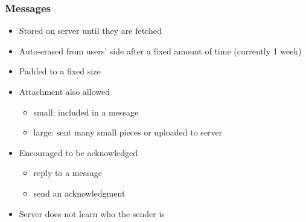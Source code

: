 \begin{frame}
	\frametitle{Messages}

	\begin{itemize}
	\setlength\itemsep{0.5em}
	\item	Stored on server until they are fetched
	\item	Auto-erased from users' side after a fixed amount of time (currently 1 week)
	\item	Padded to a fixed size
	\item	Attachment also allowed
		\begin{itemize}
		\item	small: included in a message
		\item	large: sent many small pieces or uploaded to server
		\end{itemize}
	\item	Encouraged to be acknowledged
		\begin{itemize}
		\item	reply to a message
		\item	send an acknowledgment
		\end{itemize}
	\item	Server does not learn who the sender is
	\end{itemize}
\end{frame}


